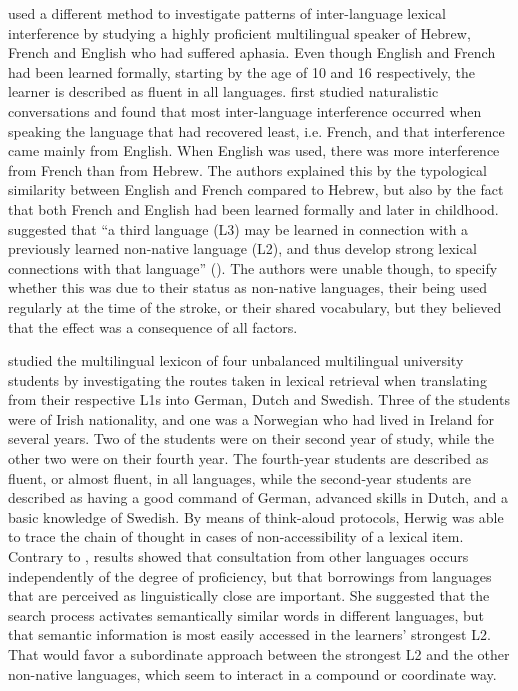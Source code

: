 \documentclass[output=paper,colorlinks,citecolor=brown,nonflat]{langsci/langscibook}
\begin{document}
\citet{GoralEtAl2006} used a different method to investigate patterns of inter-language lexical interference by studying a highly proficient multilingual speaker of Hebrew, French and English who had suffered aphasia. Even though English and French had been learned formally, starting by the age of 10 and 16 respectively, the learner is described as fluent in all languages. \citeauthor{GoralEtAl2006} first studied naturalistic conversations and found that most inter-language interference occurred when speaking the language that had recovered least, i.e. French, and that interference came mainly from English. When English was used, there was more interference from French than from Hebrew. The authors explained this by the typological similarity between English and French compared to Hebrew, but also by the fact that both French and English had been learned formally and later in childhood. \citeauthor{GoralEtAl2006} suggested that “a third language (L3) may be learned in connection with a previously learned non-native language (L2), and thus develop strong lexical connections with that language” (\citealt[244]{GoralEtAl2006}). The authors were unable though, to specify whether this was due to their status as non-native languages, their being used regularly at the time of the stroke, or their shared vocabulary, but they believed that the effect was a consequence of all factors.

\citet{Herwig2001} studied the multilingual lexicon of four unbalanced multilingual university students by investigating the routes taken in lexical retrieval when translating from their respective L1s into German, Dutch and Swedish. Three of the students were of Irish nationality, and one was a Norwegian who had lived in Ireland for several years. Two of the students were on their second year of study, while the other two were on their fourth year. The fourth-year students are described as fluent, or almost fluent, in all languages, while the second-year students are described as having a good command of German, advanced skills in Dutch, and a basic knowledge of Swedish. By means of think-aloud protocols, Herwig was able to trace the chain of thought in cases of non-accessibility of a lexical item. Contrary to \citet{GoralEtAl2006}, results showed that consultation from other languages occurs independently of the degree of proficiency, but that borrowings from languages that are perceived as linguistically close are important. She suggested that the search process activates semantically similar words in different languages, but that semantic information is most easily accessed in the learners’ strongest L2. That would favor a subordinate approach between the strongest L2 and the other non-native languages, which seem to interact in a compound or coordinate way.
\end{document}
